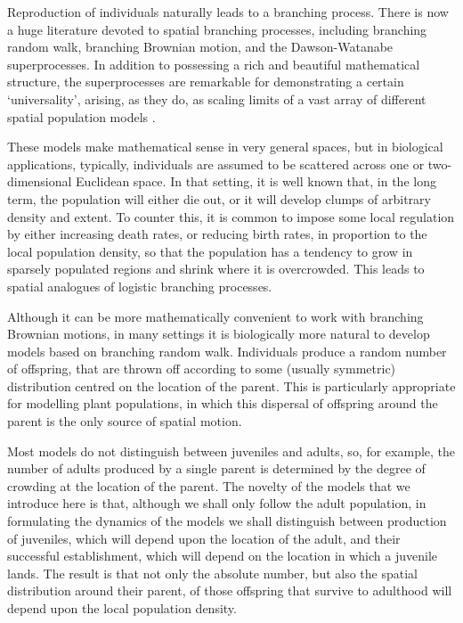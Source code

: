 \documentclass[12pt]{article}
\begin{document}
Reproduction of individuals naturally leads to a branching process.
There is now a huge literature devoted to spatial branching processes,
including branching random walk, 
branching Brownian motion, and the Dawson-Watanabe superprocesses.  
In addition to possessing a rich and beautiful mathematical structure, 
the superprocesses are remarkable for demonstrating a certain `universality', 
arising, as they do, as scaling limits of a vast array of different 
spatial population models \cite[e.g.,][]{chetwynd-diggle/etheridge:2018,
cox/perkins:2005,
cox/durrett/perkins:1999,
cox/durrett/perkins:2000,
holmes:2008,
vanderhofstad/sakai:2010,
vanderhofstad/slade:2003,
vanderhofstad/holmes/perkins:2017}.

These models make mathematical sense in very general spaces, but
in biological applications, typically, 
individuals are assumed to be scattered across one or two-dimensional
Euclidean space. In that setting, it is well known that, 
in the long term, the population will either 
die out, or it will develop clumps of arbitrary density and extent. 
To counter this, it is common to
impose some local regulation by either increasing death rates, or 
reducing birth rates, in proportion to the local population density,
so that the population has a tendency to grow in sparsely populated regions
and shrink where it is overcrowded. This leads to spatial analogues of  
logistic branching processes.

Although it can be more mathematically convenient to work with branching
Brownian motions, in many settings it is biologically more natural to 
develop models based on branching random walk.  
Individuals produce a random number of offspring,
that are thrown off according to some (usually symmetric) 
distribution centred on the location of the parent.   
This is particularly appropriate for modelling plant populations, in which
this dispersal of offspring around the parent is the only source of
spatial motion.


Most models do not distinguish between juveniles and adults, so,
for example, the number of adults produced by a single parent is determined
by the degree of crowding at the location of the parent. The novelty
of the models that we introduce here is that, although we shall only
follow the adult population, in formulating the dynamics of the
models we shall distinguish
between production of juveniles, which will depend upon the location of 
the adult, and their successful establishment, which will depend on the
location in which a juvenile lands. The result is that not only the absolute 
number, but also the spatial distribution
around their parent, 
of those offspring that survive to adulthood
will depend upon the local population 
density. 
\end{document}
